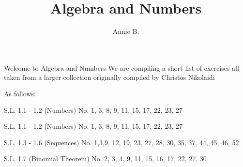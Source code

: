 \documentclass{article}
\title{Algebra and Numbers}
\author{Annie B.}
\begin{document}
  \maketitle
  \newpage

  Welcome to Algebra and Numbers
  \newpage
  We are compiling a short list of exercises all taken   from a larger collection originally compiled by Christos Nikolaidi
  
  As follows:

     S.L. 1.1 - 1.2 (Numbers)
     No. 1, 3, 8, 9, 11, 15, 17, 22, 23, 27


     S.L. 1.1 - 1.2 (Numbers)
     No. 1, 3, 8, 9, 11, 15, 17, 22, 23, 27

     S.L. 1.3 - 1.6 (Sequences)
     No. 1,3,9, 12, 19, 23, 27, 
     28, 30, 35, 37, 44, 45, 46, 52

     S.L. 1.7 (Binomial Theorem)
     No.  2, 3, 4, 9, 11, 15, 16, 17, 22, 27, 30 


  
  
\end{document}
